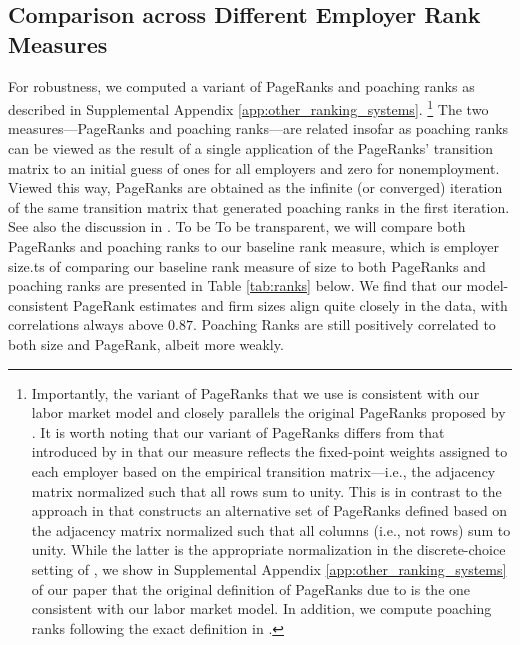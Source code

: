 \subsection{Comparison across Different Employer Rank Measures\label{app:comparison_ranks}}

For robustness, we computed a variant of PageRanks \citep{PageBrinMotwaniWinograd1999, Sorkin2018} and poaching ranks \citep{BaggerLentz2019} as described in Supplemental Appendix \ref{app:other_ranking_systems}.%
%
\footnote{Importantly, the variant of PageRanks that we use is consistent with our labor market model and closely parallels the original PageRanks proposed by \citet{PageBrinMotwaniWinograd1999}. It is worth noting that our variant of PageRanks differs from that introduced by \citet{Sorkin2018} in that our measure reflects the fixed-point weights assigned to each employer based on the empirical transition matrix---i.e., the adjacency matrix normalized such that all rows sum to unity. This is in contrast to the approach in \citet{Sorkin2018} that constructs an alternative set of PageRanks defined based on the adjacency matrix normalized such that all columns (i.e., not rows) sum to unity. While the latter is the appropriate normalization in the discrete-choice setting of \citet{Sorkin2018}, we show in Supplemental Appendix \ref{app:other_ranking_systems} of our paper that the original definition of PageRanks due to \citet{PageBrinMotwaniWinograd1999} is the one consistent with our labor market model. In addition, we compute poaching ranks following the exact definition in \citep{BaggerLentz2019}.} %
%
The two measures---PageRanks and poaching ranks---are related insofar as poaching ranks can be viewed as the result of a single application of the PageRanks' transition matrix to an initial guess of ones for all employers and zero for nonemployment. Viewed this way, PageRanks are obtained as the infinite (or converged) iteration of the same transition matrix that generated poaching ranks in the first iteration. See also the discussion in \citet{Lentz2024}. To be To be transparent, we will compare both PageRanks and poaching ranks to our baseline rank measure, which is employer size.ts of comparing our baseline rank measure of size to both PageRanks and poaching ranks are presented in Table \ref{tab:ranks} below. We find that our model-consistent PageRank estimates and firm sizes align quite closely in the data, with correlations always above $0.87$. Poaching Ranks are still positively correlated to both size and PageRank, albeit more weakly.
